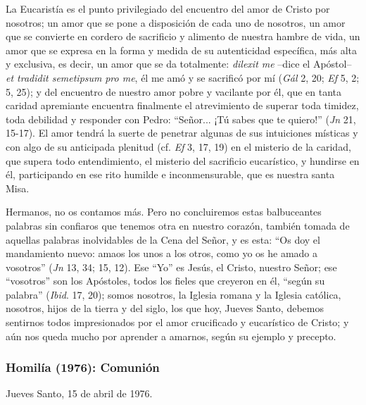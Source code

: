 			\begin{body}La Eucaristía es el punto privilegiado del encuentro del amor de Cristo por nosotros; un amor que se pone a disposición de cada uno de nosotros, un amor que se convierte en cordero de sacrificio y alimento de nuestra hambre de vida, un amor que se expresa en la forma y medida de su autenticidad específica, más alta y exclusiva, es decir, un amor que se da totalmente: \textit{dilexit me} –dice el Apóstol– \textit{et tradidit semetipsum} \textit{pro me}, él me amó y se sacrificó por mí (\textit{Gál }2, 20; \textit{Ef }5, 2; 5, 25); y del encuentro de nuestro amor pobre y vacilante por él, que en tanta caridad apremiante encuentra finalmente el atrevimiento de superar toda timidez, toda debilidad y responder con Pedro: “Señor... ¡Tú sabes que te quiero!” (\textit{Jn} 21, 15-17). El amor tendrá la suerte de penetrar algunas de sus intuiciones místicas y con algo de su anticipada plenitud (cf. \textit{Ef }3, 17, 19) en el misterio de la caridad, que supera todo entendimiento, el misterio del sacrificio eucarístico, y hundirse en él, participando en ese rito humilde e inconmensurable, que es nuestra santa Misa. \end{body}
			
			\begin{body}Hermanos, no os contamos más. Pero no concluiremos estas balbuceantes palabras sin confiaros que tenemos otra en nuestro corazón, también tomada de aquellas palabras inolvidables de la Cena del Señor, y es esta: “Os doy el mandamiento nuevo: amaos los unos a los otros, como yo os he amado a vosotros” (\textit{Jn} 13, 34; 15, 12). Ese “Yo” es Jesús, el Cristo, nuestro Señor; ese “vosotros” son los Apóstoles, todos los fieles que creyeron en él, “según su palabra” (\textit{Ibid}. 17, 20); somos nosotros, la Iglesia romana y la Iglesia católica, nosotros, hijos de la tierra y del siglo, los que hoy, Jueves Santo, debemos sentirnos todos impresionados por el amor crucificado y eucarístico de Cristo; y aún nos queda mucho por aprender a amarnos, según su ejemplo y precepto.\end{body}
			
			\subsubsection{Homilía (1976): Comunión}
			
			\begin{referencia}Jueves Santo, 15 de abril de 1976.\end{referencia}
			
